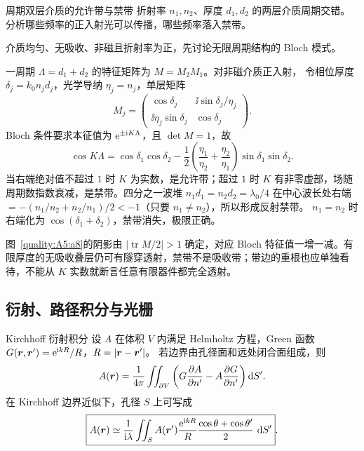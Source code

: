 \begin{advexamplebox}{周期双层介质的允许带与禁带}\label{advA5:ex:photonic-crystal}
折射率 $n_1,n_2$、厚度 $d_1,d_2$ 的两层介质周期交错。
分析哪些频率的正入射光可以传播，哪些频率落入禁带。

介质均匀、无吸收、非磁且折射率为正，先讨论无限周期结构的 Bloch 模式。

\end{advexamplebox}
\begin{advsolution}
一周期 $\Lambda=d_1+d_2$ 的特征矩阵为 $M=M_2M_1$。对非磁介质正入射，
令相位厚度 $\delta_j=k_0n_jd_j$，光学导纳 $\eta_j=n_j$，单层矩阵
\[
 M_j=
 \begin{pmatrix}
 \cos\delta_j&\ii\sin\delta_j/\eta_j\\
 \ii\eta_j\sin\delta_j&\cos\delta_j
 \end{pmatrix}.
\]
Bloch 条件要求本征值为 $\mathrm e^{\pm\mathrm i K\Lambda}$，且 $\det M=1$，故
\[
 \boxed{\cos K\Lambda=
 \cos\delta_1\cos\delta_2
 -\frac12\left(\frac{\eta_1}{\eta_2}
 +\frac{\eta_2}{\eta_1}\right)
 \sin\delta_1\sin\delta_2}.
\]
当右端绝对值不超过 $1$ 时 $K$ 为实数，是允许带；超过 $1$ 时
$K$ 有非零虚部，场随周期数指数衰减，是禁带。四分之一波堆
$n_1d_1=n_2d_2=\lambda_0/4$ 在中心波长处右端
$=-(n_1/n_2+n_2/n_1)/2<-1$（只要 $n_1\ne n_2$），所以形成反射禁带。
$n_1=n_2$ 时右端化为 $\cos(\delta_1+\delta_2)$，禁带消失，极限正确。


图~\ref{quality:A5:a8}的阴影由 $|\operatorname{tr}M/2|>1$ 确定，对应 Bloch 特征值一增一减。有限厚度的无吸收叠层仍可有隧穿透射，禁带不是吸收带；带边的重根也应单独看待，不能从 $K$ 实数就断言任意有限器件都完全透射。
\end{advsolution}

\subsection{衍射、路径积分与光栅}

\begin{advtheorem}{Kirchhoff 衍射积分}\label{advA5:thm:kirchhoff}
设 $A$ 在体积 $V$ 内满足 Helmholtz 方程，Green 函数
$G(\bm{r},\bm{r}')=\mathrm e^{\mathrm i kR}/R$，$R=|\bm{r}-\bm{r}'|$。
若边界由孔径面和远处闭合面组成，则
\[
 A(\bm{r})=\frac1{4\pi}\iint_{\partial V}
 \left(G\frac{\partial A}{\partial n'}
 -A\frac{\partial G}{\partial n'}\right)\mathop{}\!\mathrm d S'.
\]
在 Kirchhoff 边界近似下，孔径 $S$ 上可写成
\[
 \boxed{A(\bm{r})\simeq\frac1{\mathrm i\lambda}
 \iint_S A(\bm{r}')\frac{\mathrm e^{\mathrm i kR}}{R}
 \frac{\cos\theta+\cos\theta'}2\,\mathop{}\!\mathrm d S'}.
\]
\end{advtheorem}


